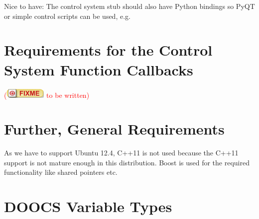 \documentclass[11pt,a4paper]{scrartcl}
\newcounter{nFixmes}
\newcommand{\fixme}[1]{\addtocounter{nFixmes}{1}\textcolor{red}{(\includegraphics[height=2ex]{fixme} #1)}\xspace}
\begin{document}
Nice to have: The control system stub should also have Python bindings so PyQT
or simple control scripts can be used, e.g.

\section{Requirements for the Control System Function Callbacks}
\label{section_function_callbacks}
\fixme{to be written}

\section{Further, General Requirements}
As we have to support Ubuntu 12.4, C++11 is not used because the C++11 support
is not mature enough in this distribution. Boost is used for the required
functionality like shared pointers etc.

\appendix
\section{DOOCS Variable Types}
\end{document}
